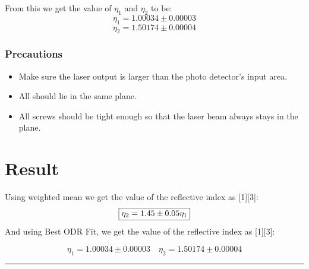 \documentclass[%
sor,
 jor,
 amsmath,amssymb,
 reprint,
]{revtex4-2}
\begin{document}
From this we get the value of $\eta_1$ and $\eta_2$ to be: 
$$\eta_1 = 1.00034\pm 0.00003 $$ 
$$\eta_2 = 1.50174\pm 0.00004 $$


\subsubsection{Precautions}
\begin{itemize}
	\item Make sure the laser output is larger than the photo detector's input area.
	\item All should lie in the same plane.
	\item All screws should be tight enough so that the laser beam always stays in the plane.
\end{itemize}



\section{Result}
Using weighted mean we get the value of the reflective index as [1][3]:  
\[
\boxed{
\eta_2 = 1.45 \pm 0.05 \eta_1 \\
}
\]
And using Best ODR Fit, we get the value of the reflective index as [1][3]:  

\[
\boxed{
	\eta_1 = 1.00034 \pm 0.00003  \,\,\,\,\,\,
\eta_2 = 1.50174\pm 0.00004
}
\]


\noindent\rule{\linewidth}{0.4pt}
\vspace{3cm}



\end{document}
